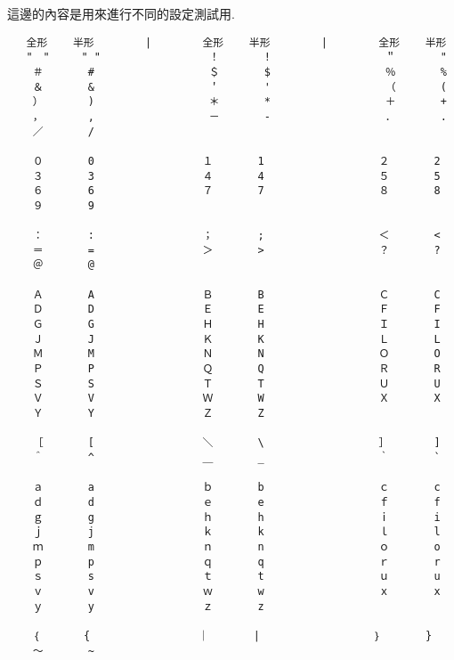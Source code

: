 %
%
%

這邊的內容是用來進行不同的設定測試用.


\begin{verbatim}
   全形    半形        |        全形    半形        |        全形    半形
   "　"     " "                 ！       !                  ＂       "
    ＃       #                  ＄       $                  ％       %
    ＆       &                  ＇       '                  （       (
    ）       )                  ＊       *                  ＋       +
    ，       ,                  －       -                  ．       .
    ／       /

    ０       0                 １       1                  ２       2
    ３       3                 ４       4                  ５       5
    ６       6                 ７       7                  ８       8
    ９       9

    ：       :                 ；       ;                  ＜       <
    ＝       =                 ＞       >                  ？       ?
    ＠       @

    Ａ       A                 Ｂ       B                  Ｃ       C
    Ｄ       D                 Ｅ       E                  Ｆ       F
    Ｇ       G                 Ｈ       H                  Ｉ       I
    Ｊ       J                 Ｋ       K                  Ｌ       L
    Ｍ       M                 Ｎ       N                  Ｏ       O
    Ｐ       P                 Ｑ       Q                  Ｒ       R
    Ｓ       S                 Ｔ       T                  Ｕ       U
    Ｖ       V                 Ｗ       W                  Ｘ       X
    Ｙ       Y                 Ｚ       Z

    ［       [                 ＼       \                  ］       ]
    ＾       ^                 ＿       _                  ｀       `

    ａ       a                 ｂ       b                  ｃ       c
    ｄ       d                 ｅ       e                  ｆ       f
    ｇ       g                 ｈ       h                  ｉ       i
    ｊ       j                 ｋ       k                  ｌ       l
    ｍ       m                 ｎ       n                  ｏ       o
    ｐ       p                 ｑ       q                  ｒ       r
    ｓ       s                 ｔ       t                  ｕ       u
    ｖ       v                 ｗ       w                  ｘ       x
    ｙ       y                 ｚ       z

    ｛       {                 ｜       |                  ｝       }
    ～       ~
\end{verbatim}

